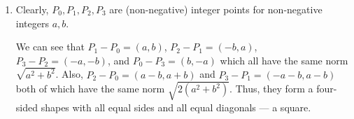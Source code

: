\documentclass[12 pt, letterpaper]{hmcpset}
\begin{document}
\begin{solution}
\begin{enumerate}
\[\begin{split}
					     & = \sqrt{a^{2} + b^{2}}.
				\end{split}
			\]
			Since we have the formula for $x_{k} + i y_{k}$, we know that $x_{k} + i y_{k} = x_{k + 4} + i y_{k + 4}$. Thus, $V$ consists of four points with the same distance between consecutive points. We also know that the distance between any two points $P_{k + 2}$ and $P_{k}$ doesn't depend on $k$. That is, any two diagonals are equal in length ---
			\[
				\begin{split}
					d & = \lVert P_{k + 2} - P_{k} \rVert \\
					  & = \left \lvert (a + i b) \left ( \frac{1 - i^{k + 2}}{1 - i} - \frac{1 - i^{k}}{1 - i} \right ) \right \rvert \\
					  & = \sqrt{a^{2} + b^{2}} \left \lvert \frac{i^{k + 2} - i^{k}}{1 - i} \right \rvert \\
					  & = \sqrt{a^{2} + b^{2}} \left \lvert \frac{-2}{1 - i} \right \rvert
				\end{split}
			\]
			Thus, the points in $V$ form a four-sided shape with all equal sides and all equal diagonals --- which uniquely characterises the shape as a square. Since the area of a square is its side squared, the square has area  $n = \ell^{2} = a^{2} + b^{2}$.
		\item Clearly, $P_{0}, P_{1}, P_{2}, P_{3}$ are (non-negative) integer points for non-negative integers $a, b$. 

			We can see that $P_{1} - P_{0} = (a, b)$, $P_{2} - P_{1} = (-b, a)$, $P_{3} - P_{2} = (-a, -b)$, and $P_{0} - P_{3} = (b, -a)$ which all have the same norm $\sqrt{a^{2} + b^{2}}$. Also, $P_{2} - P_{0} = (a - b, a + b)$ and $P_{3} - P_{1} = (-a - b, a - b)$ both of which have the same norm $\sqrt{2(a^{2} + b^{2})}$. Thus, they form a four-sided shapes with all equal sides and all equal diagonals --- a square.


\end{enumerate}
\end{solution}
\end{document}
